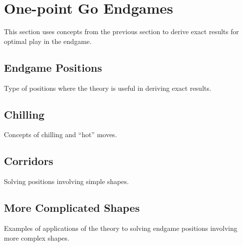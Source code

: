 \documentclass[../math194_paper.tex]{subfiles}
\begin{document}
\section{One-point Go Endgames}
This section uses concepts from the previous section to derive exact 
results for optimal play in the endgame.

\subsection{Endgame Positions}
Type of positions where the theory is useful in deriving exact results.

\subsection{Chilling}
Concepts of chilling and ``hot'' moves.

\subsection{Corridors}
Solving positions involving simple shapes.

\subsection{More Complicated Shapes}
Examples of applications of the theory to solving endgame positions 
involving more complex shapes. 
\end{document}
